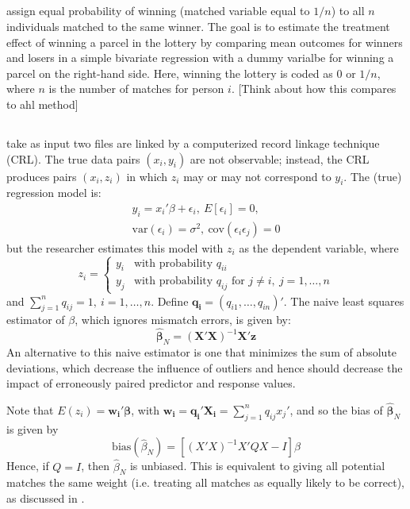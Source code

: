 \documentclass[12pt]{article}
\begin{document}
\subsection{\cite{bleakley2016}}

\cite{bleakley2016} assign equal probability of winning (matched variable equal to $1/n$) to all $n$ individuals matched to the same winner.  The goal is to estimate the treatment effect of winning a parcel in the lottery by comparing mean outcomes for winners and losers in a simple bivariate regression with a dummy varialbe for winning a parcel on the right-hand side.   Here, winning the lottery is coded as $0$ or $1/n$, where $n$ is the number of matches for person $i$. [Think about how this compares to ahl method]

\subsection{\cite{lahiri05}}
\cite{lahiri05} take as input two files are linked by a computerized record linkage technique (CRL).  The true data pairs $(x_i, y_i)$ are not observable; instead, the CRL produces pairs $(x_i, z_i)$ in which $z_i$ may or may not correspond to $y_i$.  The (true) regression model is:
\begin{gather*}y_i = x_i'\beta + \epsilon_i,\ E[\epsilon_i] = 0,\\ \text{var}(\epsilon_i) = \sigma^2,\ \text{cov}(\epsilon_i \epsilon_j) = 0 \end{gather*}
but the researcher estimates this model with $z_i$ as the dependent variable, where $$z_i = \begin{cases} y_i & \text{with probability $q_{ii}$} \\ y_j & \text{with probability $q_{ij}$ for $j\neq i,\ j = 1,\dots,n $} \end{cases}$$ 
and $\sum_{j=1}^n q_{ij} = 1, \ i=1,\dots, n$.  Define $\mathbf{q_i} = (q_{i1}, \dots, q_{in})'$.  The naive least squares estimator of $\beta$, which ignores mismatch errors, is given by:
$$\hat{\mathbf{\beta}}_N = (\mathbf{X'X})^{-1} \mathbf{X'z} $$ 
An alternative to this naive estimator is one that minimizes the sum of absolute deviations, which decrease the influence of outliers and hence should decrease the impact of erroneously paired predictor and response values.  

Note that $E(z_i) = \mathbf{w_i'\beta}$, with $\mathbf{w_i = q_i'X_i} = \sum_{j=1}^n q_{ij} x_j' $, and so the bias of $\hat{\mathbf{\beta}}_N $ is given by
$$\text{bias}(\hat{\beta}_N) = [(X'X)^{-1} X'QX - I] \beta $$ 
Hence, if $Q = I$, then $\hat{\beta}_N$ is unbiased.  This is equivalent to giving all potential matches the same weight (i.e. treating all matches as equally likely to be correct), as discussed in \cite{ahl2019}.  
\end{document}
